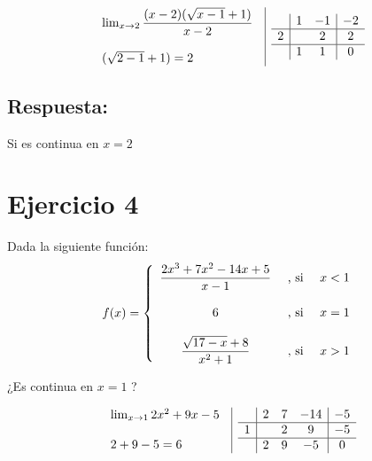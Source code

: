 \documentclass[12pt]{article}
\begin{document}
\vspace{1cm}

\[
\begin{array}{l|c}
  \begin{array}{l}
    \lim_{x \to 2} \dfrac{(x-2) (\sqrt{x - 1} + 1)}{x-2}\\\\
    (\sqrt{2 - 1} + 1) = 2
  \end{array}
  &
  \begin{array}{c|c c|c}
    & 1 & -1 & -2 \\
    \hline
    2 &  & 2 & 2 \\
    \hline
    & 1 & 1 & 0 \\
  \end{array}
\end{array}
\]

\subsection*{Respuesta:} \noindent Si es continua en $x=2$





\section*{Ejercicio 4}
\noindent Dada la siguiente función:
\[
f(x) = 
\left\{
  \begin{array}{c l l}
    \dfrac{2x^3 + 7x^2 - 14x + 5}{x-1} & \text{ , si } & x < 1 \\\\
    6 & \text{ , si } & x = 1 \\\\
    \dfrac{\sqrt{17 - x} + 8}{x^2 + 1} & \text{ , si } & x > 1
  \end{array}
\right.
\]

\noindent ¿Es continua en $x=1$ ?

\[
\begin{array}{l|c}
  \begin{array}{l}
    \lim_{x \to 1} 2x^2 + 9x - 5 \\\\
    2 + 9 - 5 = 6 
  \end{array}
  &
  \begin{array}{c|c c c|c}
    & 2 & 7 & -14 & -5 \\
    \hline
    1 &  & 2 & 9 & -5 \\
    \hline
    & 2 & 9 & -5 & 0 \\
  \end{array}
\end{array}
\]
\end{document}
